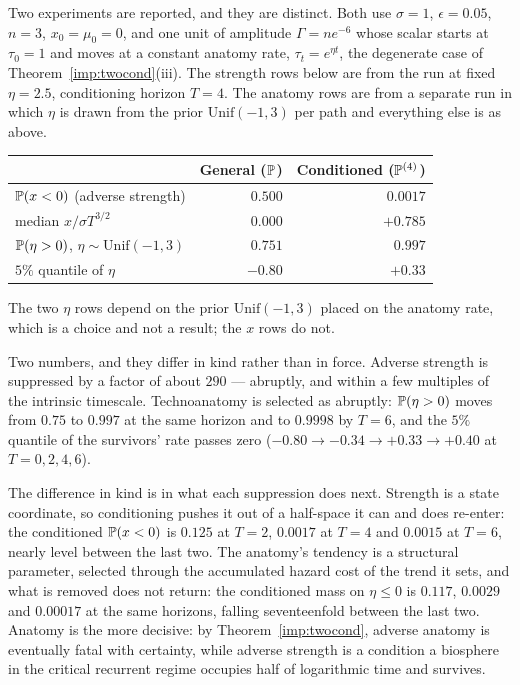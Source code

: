 Two experiments are reported, and they are distinct. Both use $\sigma=1$,
$\epsilon=0.05$, $n=3$, $x_0=\mu_0=0$, and one unit of amplitude
$\Gamma=ne^{-6}$ whose scalar starts at $\tau_0=1$ and moves at a constant
anatomy rate, $\tau_t=e^{\eta t}$, the degenerate case of
Theorem~\ref{imp:twocond}(iii). The strength rows below are from the run
at fixed $\eta=2.5$, conditioning horizon $T=4$. The anatomy rows are from
a separate run in which $\eta$ is drawn from the prior
$\mathrm{Unif}(-1,3)$ per path and everything else is as above.

\begin{center}\small
\begin{tabular}{@{}lrr@{}}
\toprule
& General ($\mathbb{P}$) & Conditioned ($\mathbb{P}^{(4)}$)\\
\midrule
$\mathbb{P}(x<0)$ (adverse strength) & $0.500$ & $0.0017$\\
median $x/\sigma T^{3/2}$ & $0.000$ & $+0.785$\\
$\mathbb{P}(\eta>0)$, $\eta\sim\mathrm{Unif}(-1,3)$ & $0.751$ & $0.997$\\
$5\%$ quantile of $\eta$ & $-0.80$ & $+0.33$\\
\bottomrule
\end{tabular}
\end{center}

\noindent The two $\eta$ rows depend on the prior $\mathrm{Unif}(-1,3)$
placed on the anatomy rate, which is a choice and not a result; the $x$
rows do not.

\begin{remark}\label{gr:rem:truncresc}
Two numbers, and they differ in kind rather than in force. Adverse
strength is suppressed by a factor of about $290$ --- abruptly, and
within a few multiples of the intrinsic timescale. Technoanatomy is
selected as abruptly: $\mathbb{P}(\eta>0)$ moves from $0.75$ to $0.997$ at the
same horizon and to $0.9998$ by $T=6$, and the $5\%$ quantile of the
survivors' rate passes zero ($-0.80\to-0.34\to+0.33\to+0.40$ at
$T=0,2,4,6$).

The difference in kind is in what each suppression does next. Strength is
a state coordinate, so conditioning pushes it out of a half-space it can
and does re-enter: the conditioned $\mathbb{P}(x<0)$ is $0.125$ at $T=2$,
$0.0017$ at $T=4$ and $0.0015$ at $T=6$, nearly level between the last
two. The anatomy's tendency is a structural parameter, selected through
the accumulated hazard cost of the trend it sets, and what is removed does
not return: the conditioned mass on $\eta\le0$ is $0.117$, $0.0029$ and
$0.00017$ at the same horizons, falling seventeenfold between the last
two. Anatomy is the more decisive:
by Theorem~\ref{imp:twocond}, adverse anatomy is eventually fatal
with certainty, while adverse strength is a condition a biosphere in the critical
recurrent regime occupies half of logarithmic time and survives.

\end{remark}

